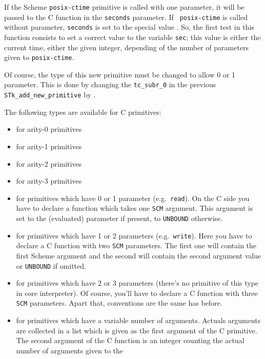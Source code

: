 \documentclass[10pt]{article}
\begin{document}
If the Scheme {\tt posix-ctime} primitive is called with one parameter, it
will be passed to the C function in the {\tt seconds} parameter. If {\tt
posix-ctime} is called without parameter, {\tt seconds} is set to the special
value . So, the first test in this function consists to set a
correct value to the variable {\tt sec}; this value is either the current
time, either the given integer, depending of the number of parameters
given to {\tt posix-ctime}.

Of course, the type of this new primitive must be changed to allow 0 or 1
parameter. This is done by changing the {\tt tc\_subr\_0} in the previous 
{\tt STk\_add\_new\_primitive} by .

The following types are available for C primitives:
\begin{itemize}
\item {} for arity-0 primitives
\item {} for arity-1 primitives
\item {} for arity-2 primitives
\item {} for arity-3 primitives
\item {} for primitives 
      which have 0 or 1 parameter
      (e.g.~{\tt read}). On the C side you have to declare a function
      which takes one {\tt SCM} argument. This argument is set to the
      (evaluated) parameter if present, to {\tt UNBOUND} otherwise.
\item {} for 
      primitives which have 1 or 2 parameters
      (e.g.~{\tt write}). Here you have to declare a C function with
      two {\tt SCM} parameters. The first one will contain the first Scheme 
      argument and the second will contain the second argument value
      or {\tt UNBOUND} if omitted.
\item {} for 
      primitives which have 2 or 3 parameters
      (there's no primitive of this type in core interpreter).
      Of course, you'll have to declare a C function with three {\tt SCM}
      parameters. Apart that, conventions are the same has before.
\item {} for primitives which have a variable number of
      arguments. Actuals arguments are collected in a list which is given as the
      first argument of the C primitive. The second argument of the C function
      is an integer counting the actual number of arguments given to the

\end{itemize}
\end{document}
